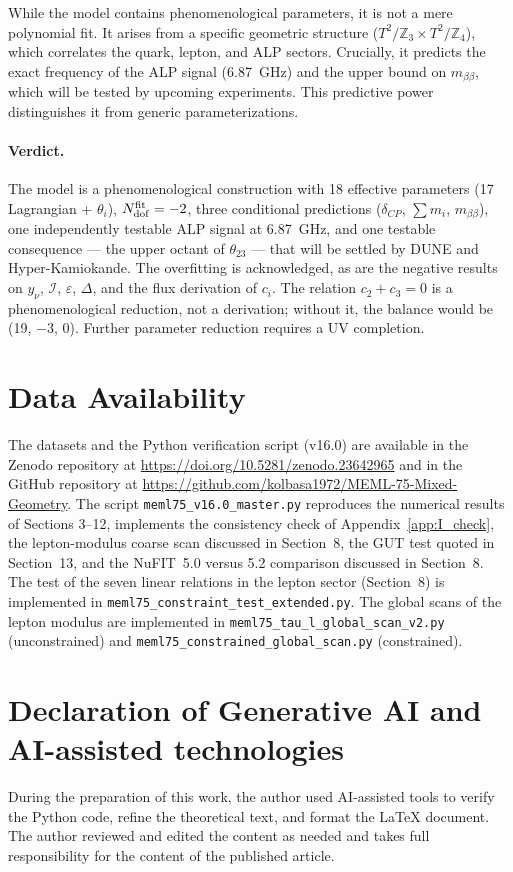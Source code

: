 \documentclass[12pt,a4paper]{article}
\numberwithin{equation}{section}
\begin{document}
While the model contains phenomenological parameters, it is not a mere polynomial fit. It arises from a specific geometric structure (\(T^2/\mathbb{Z}_3 \times T^2/\mathbb{Z}_4\)), which correlates the quark, lepton, and ALP sectors. Crucially, it predicts the exact frequency of the ALP signal (6.87~GHz) and the upper bound on \(m_{\beta\beta}\), which will be tested by upcoming experiments. This predictive power distinguishes it from generic parameterizations.

\paragraph{Verdict.} The model is a phenomenological construction with 18 effective parameters (17 Lagrangian + \(\theta_i\)), \(N_{\rm dof}^{\rm fit} = -2\), three conditional predictions (\(\delta_{CP}\), \(\sum m_i\), \(m_{\beta\beta}\)), one independently testable ALP signal at 6.87~GHz, and one testable consequence --- the upper octant of \(\theta_{23}\) --- that will be settled by DUNE and Hyper-Kamiokande. The overfitting is acknowledged, as are the negative results on \(y_\nu\), \(\mathcal I\), \(\varepsilon\), \(\Delta\), and the flux derivation of \(c_i\). The relation \(c_2 + c_3 = 0\) is a phenomenological reduction, not a derivation; without it, the balance would be (19, \(-3\), \(0\)). Further parameter reduction requires a UV completion.

\section*{Data Availability}
The datasets and the Python verification script (v16.0) are available in the Zenodo repository at \url{https://doi.org/10.5281/zenodo.23642965} and in the GitHub repository at \url{https://github.com/kolbasa1972/MEML-75-Mixed-Geometry}. The script \texttt{meml75\_v16.0\_master.py} reproduces the numerical results of Sections 3--12, implements the consistency check of Appendix~\ref{app:I_check}, the lepton-modulus coarse scan discussed in Section~8, the GUT test quoted in Section~13, and the NuFIT~5.0 versus 5.2 comparison discussed in Section~8. The test of the seven linear relations in the lepton sector (Section~8) is implemented in \texttt{meml75\_constraint\_test\_extended.py}. The global scans of the lepton modulus are implemented in \texttt{meml75\_tau\_l\_global\_scan\_v2.py} (unconstrained) and \texttt{meml75\_constrained\_global\_scan.py} (constrained).

\section*{Declaration of Generative AI and AI-assisted technologies}
During the preparation of this work, the author used AI-assisted tools to verify the Python code, refine the theoretical text, and format the LaTeX document. The author reviewed and edited the content as needed and takes full responsibility for the content of the published article.
\end{document}
